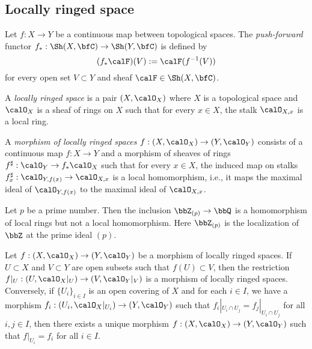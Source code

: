 

\subsection{Locally ringed space}

       \begin{definition}\label{def:push_forward_of_sheaves}
        Let \(f : X \to Y\) be a continuous map between topological spaces.
        The \emph{push-forward} functor \(f_* : \Sh(X, \bfC) \to \Sh(Y, \bfC)\) is defined by 
        \[
            (f_*\calF)(V) := \calF(f^{-1}(V))
        \]
        for every open set \(V \subset Y\) and sheaf \(\calF \in \Sh(X, \bfC)\).
    \end{definition}
    
    \begin{definition}\label{def:locally_ringed_space}
        A \emph{locally ringed space} is a pair \((X, \calO_X)\) where \(X\) is a topological space and \(\calO_X\) is a sheaf of rings on \(X\) such that for every \(x \in X\), the stalk \(\calO_{X,x}\) is a local ring.
        
        A \emph{morphism of locally ringed spaces} \(f : (X, \calO_X) \to (Y, \calO_Y)\) consists of a continuous map \(f : X \to Y\) and a morphism of sheaves of rings \(f^\sharp : \calO_Y \to f_*\calO_X\) 
        such that for every \(x \in X\), the induced map on stalks \(f_x^\sharp : \calO_{Y,f(x)} \to \calO_{X,x}\) is a local homomorphism, 
        i.e., it maps the maximal ideal of \(\calO_{Y,f(x)}\) to the maximal ideal of \(\calO_{X,x}\).
    \end{definition}

    \begin{example}\label{eg:non_local_homomorphism_of_local_rings}
        Let \(p\) be a prime number.
        Then the inclusion \(\bbZ_{(p)} \to \bbQ\) is a homomorphism of local rings but not a local homomorphism.
        Here \(\bbZ_{(p)}\) is the localization of \(\bbZ\) at the prime ideal \((p)\).
    \end{example}

    \begin{construction}\label{constr:glue_morphisms_of_locally_ringed_spaces}
        Let \(f : (X, \calO_X) \to (Y, \calO_Y)\) be a morphism of locally ringed spaces.
        If \(U \subset X\) and \(V \subset Y\) are open subsets such that \(f(U) \subset V\), then the restriction \(f|_U : (U, \calO_X|_U) \to (V, \calO_Y|_V)\) is a morphism of locally ringed spaces.
        Conversely, if \(\{U_i\}_{i \in I}\) is an open covering of \(X\) and for each \(i \in I\), we have a morphism \(f_i : (U_i, \calO_X|_{U_i}) \to (Y, \calO_Y)\) such that \(f_i|_{U_i \cap U_j} = f_j|_{U_i \cap U_j}\) for all \(i,j \in I\),
        then there exists a unique morphism \(f : (X, \calO_X) \to (Y, \calO_Y)\) such that \(f|_{U_i} = f_i\) for all \(i \in I\).
    \end{construction}

